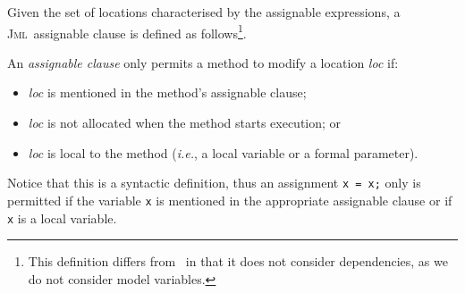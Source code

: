 \documentclass[a4paper]{llncs}
\newcommand{\defn}[1]{\:\hat{#1}\:}
\newcommand{\jml}{\textsc{Jml}}
\begin{document}
Given the set of locations characterised by the assignable
expressions, a \jml\ assignable clause is defined as
follows\footnote{This definition differs
from~\cite{LeavensBR00} in that it does not consider dependencies, 
as we do not consider model variables.}.
\begin{definition}
\label{def-mod}
An \emph{assignable clause} only permits a method to modify a location
\emph{loc} if:
\begin{itemize}
\item \emph{loc} is mentioned in the method's assignable
clause;
\item \emph{loc} is not allocated when the method starts execution; or
\item \emph{loc} is local to the method (\emph{i.e.}, a local
variable or a formal parameter).
\end{itemize}
\end{definition}

Notice that this is a syntactic definition, thus an assignment
\texttt{x = x;} only is permitted if the 
variable \texttt{x} is mentioned in the appropriate assignable clause
or if \texttt{x} is a local variable.




\end{document}
